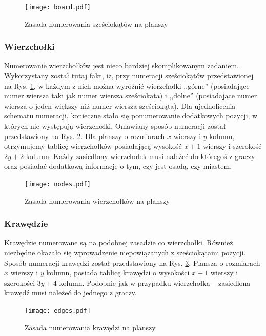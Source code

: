 \documentclass[a4paper,12pt]{article}
\providecommand{\imref}[1]{Rys. \ref{#1}} %
\begin{document}
\begin{figure}[ht]
  \begin{center}
    \texttt{[image: board.pdf]}
  \end{center}
  \caption{Zasada numerowania sześciokątów na planszy}
  \label{board}
\end{figure}

\subsubsection{Wierzchołki}
Numerowanie wierzchołków jest nieco bardziej skomplikowanym
zadaniem. Wykorzystany został tutaj fakt, iż, przy numeracji
sześciokątów przedstawionej na \imref{board}, w każdym z nich można
wyróżnić wierzchołki ,,górne'' (posiadające numer wiersza taki jak
numer wiersza sześciokąta) i ,,dolne'' (posiadające numer wiersza o
jeden większy niż numer wiersza sześciokąta). Dla ujednolicenia
schematu numeracji, konieczne stało się ponumerowanie dodatkowych
pozycji, w których nie występują wierzchołki. Omawiany sposób
numeracji został przedstawiony na \imref{nodes}. Dla planszy o
rozmiarach $x$ wierszy i $y$ kolumn, otrzymujemy tablicę wierzchołków
posiadającą wysokość $x+1$ wierszy i szerokość $2y+2$ kolumn. Każdy
zasiedlony wierzchołek musi należeć do któregoś z graczy oraz posiadać
dodatkową informację o tym, czy jest osadą, czy miastem.

\begin{figure}[ht]
  \begin{center}
    \texttt{[image: nodes.pdf]}
  \end{center}
  \caption{Zasada numerowania wierzchołków na planszy}
  \label{nodes}
\end{figure}

\subsubsection{Krawędzie}
Krawędzie numerowane są na podobnej zasadzie co wierzchołki. Również
niezbędne okazało się wprowadzenie niepowiązanych z sześciokątami
pozycji. Sposób numeracji krawędzi został przedstawiony na
\imref{edges}. Plansza o rozmiarach $x$ wierszy i $y$ kolumn, posiada
tablicę krawędzi o wysokości $x+1$ wierszy i szerokości $3y+4$
kolumn. Podobnie jak w przypadku wierzchołka -- zasiedlona krawędź
musi należeć do jednego z graczy.

\begin{figure}[ht]
  \begin{center}
    \texttt{[image: edges.pdf]}
  \end{center}
  \caption{Zasada numerowania krawędzi na planszy}
  \label{edges}
\end{figure}
\end{document}
